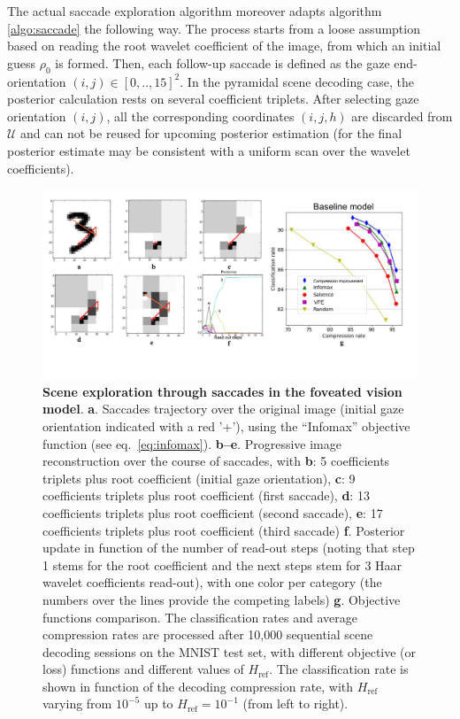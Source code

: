 \documentclass[12pt,twoside,openright]{article}
\begin{document}
The actual saccade exploration algorithm moreover adapts algorithm \ref{algo:saccade} the following way. The process starts from a loose assumption based on reading the root wavelet coefficient of the image, from which an initial guess $\rho_0$ is formed. Then, each follow-up saccade is {\color{Purple} defined as the gaze end-orientation} $(i,j) \in [0,..,15]^2$. {\color{Purple}In the pyramidal scene decoding case}, the posterior calculation rests on several coefficient triplets. After selecting gaze orientation $(i,j)$, all the corresponding coordinates $(i,j,h)$ are discarded from $\mathcal{U}$ and can not be reused for upcoming posterior estimation (for the final posterior estimate may be consistent with a uniform scan over the wavelet coefficients). 

\begin{figure}[b!]
	\centerline{
		\includegraphics[width=\linewidth]{img/frontiers-saccade.pdf}}
	\vspace{-.2cm}
	\caption{\textbf{Scene exploration through saccades in the foveated vision model}. \textbf{a}. Saccades trajectory over the original image (initial gaze orientation indicated with a red '+'), using the ``Infomax'' objective function (see eq.~\ref{eq:infomax}). \textbf{b--e}. Progressive image reconstruction over the course of saccades, with \textbf{b}: 5 coefficients triplets plus root coefficient (initial gaze orientation), \textbf{c}: 9 coefficients triplets plus root coefficient (first saccade), \textbf{d}: 13 coefficients triplets plus root coefficient (second saccade), \textbf{e}: 17 coefficients triplets plus root coefficient (third saccade) \textbf{f}. Posterior update in function of the number of read-out steps (noting that step 1 stems for the root coefficient and the next steps stem for 3 Haar wavelet coefficients read-out), with one color per category (the numbers over the lines provide the competing labels) \textbf{g}. Objective functions comparison. The classification rates and average compression rates are processed after 10,000 sequential scene decoding sessions on the MNIST test set, with different objective (or loss) functions and different values of $H_\text{ref}$.  The classification rate is shown in function of the decoding compression rate, with $H_\text{ref}$ varying from $10^{-5}$ up to  $H_\text{ref}=10^{-1}$ (from left to right).}\label{fig:foveated-saccades}
\end{figure}
\end{document}
